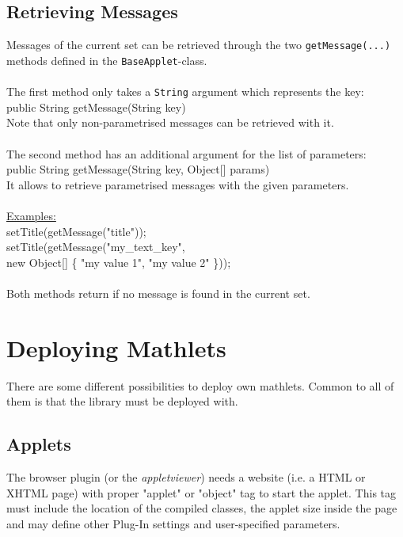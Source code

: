   \subsection{Retrieving Messages}
  Messages of the current set can be retrieved through the two {\tt getMessage(...)} 
  methods defined in the {\tt BaseApplet}-class.\\\\
  The first method only takes a {\tt String} argument which represents the key:\\
  {\small\ttfamily
    \indent public String getMessage(String key)
  }\\
  Note that only non-parametrised messages can be retrieved with it.\\\\
  The second method has an additional argument for the list of parameters:\\
  {\small\ttfamily
    \indent public String getMessage(String key, Object[] params)
  }\\
  It allows to retrieve parametrised messages with the given parameters.\\\\
  \underline{Examples:}\\
  {\small\ttfamily
    \indent setTitle(getMessage("title"));\\
    \indent setTitle(getMessage("my\_text\_key",\\
    \indent\indent\indent new Object[] \{ "my value 1", "my value 2" \}));\\
  }\\
  Both methods return  if no message is found in the current set.

\newpage
\section{Deploying Mathlets}
  There are some different possibilities to deploy own mathlets. Common to all of them is that
  the \mf library must be deployed with.

  \subsection{Applets}
  The browser plugin (or the \textit{appletviewer}) needs a website (i.e. a HTML or XHTML page)
  with proper "applet" or "object" tag to start the applet. This tag must include
  the location of the compiled classes, the applet size inside the page and may define
  other Plug-In settings and user-specified parameters.

